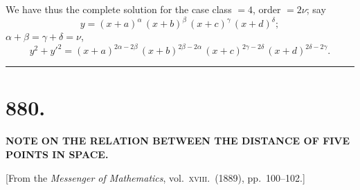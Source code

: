 \documentclass[11pt,a4paper]{book}
\begin{document}
We have thus the complete solution for the case class $= 4$, order $= 2\nu$; say
\[
y = (x + a)^{\alpha}\,(x + b)^{\beta}\,(x + c)^{\gamma}\,(x + d)^{\delta};
\]
$\alpha + \beta = \gamma + \delta = \nu$,
\[
y^{2} + y'^{2} = (x + a)^{2\alpha - 2\beta}\,(x + b)^{2\beta - 2\alpha}\,(x + c)^{2\gamma - 2\delta}\,(x + d)^{2\delta - 2\gamma}.
\]
\clearpage


\thispagestyle{empty}

\vspace{-1cm}
\begin{center}
\rule{0.8\textwidth}{0.4pt}
\end{center}


\newpage
\section*{880.}

\begin{center}
\textbf{NOTE ON THE RELATION BETWEEN THE DISTANCE OF FIVE POINTS IN SPACE.}
\end{center}

\begin{center}
[From the \textit{Messenger of Mathematics}, vol.\ \textsc{xviii}.\ (1889), pp.\ 100--102.]
\end{center}
\end{document}
